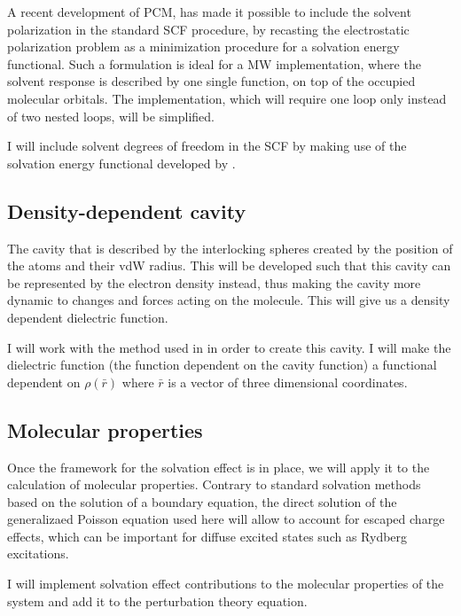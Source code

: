 \documentclass[a4paper,11pt]{article}
\begin{document}
A recent development of \ac{PCM}, has made it possible to include the
solvent polarization in the standard
\ac{SCF} procedure, by recasting the electrostatic polarization
problem as a minimization procedure for a solvation energy
functional\cite{Lipparini:2010bg}. Such a formulation is
ideal for a
\ac{MW} implementation, where the solvent response is described by one
single function, on top of the occupied molecular
orbitals. The implementation, which
will require one loop only instead of two nested loops, will be simplified.

I will include solvent degrees of freedom in the \ac{SCF} by making use of the
solvation energy functional developed by \cite{Lipparini:2010bg}.

\subsection{Density-dependent cavity}

The cavity that is described by the interlocking spheres created by
the position of the atoms and their \ac{vdW} radius. This will be
developed such that this cavity can be represented by the electron
density instead, thus making the cavity more dynamic to changes and
forces acting on the molecule. This will give us a density dependent
dielectric function.

I will work with the method used in \cite{FossoTande:2013ka} in order
to create this cavity. I will make the dielectric function (the function
dependent on the cavity function) a functional dependent on $\rho(\bar{r})$
where $\bar{r}$ is a vector of three dimensional coordinates.

\subsection{Molecular properties}

Once the framework for the solvation effect is in place, we will apply
it to the calculation of molecular properties. Contrary to standard
solvation methods based on the solution of a boundary equation, the
direct solution of the generalizaed Poisson equation used here will allow to
account for escaped charge effects, which can be important for diffuse
excited states such as Rydberg excitations.

I will implement solvation effect contributions to the molecular properties
of the system and add it to the perturbation theory equation.
\end{document}
